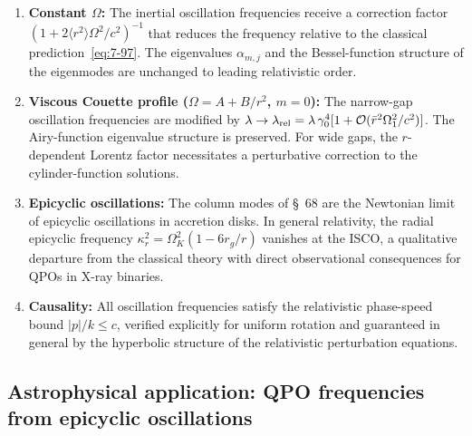 \begin{enumerate}
\item \textbf{Constant $\Omega$:} The inertial oscillation frequencies
  receive a correction factor $(1+2\langle r^2\rangle\Omega^2/c^2)^{-1}$
  that reduces the frequency relative to the classical
  prediction~\eqref{eq:7-97}.  The eigenvalues $\alpha_{m,j}$ and
  the Bessel-function structure of the eigenmodes are unchanged to
  leading relativistic order.

\item \textbf{Viscous Couette profile ($\Omega = A+B/r^2$, $m=0$):}
  The narrow-gap oscillation frequencies are modified by
  $\lambda \to \lambda_{\mathrm{rel}} = \lambda\,\gamma_0^4[1+\mathcal{O}(\bar{r}^2\Omega_1^2/c^2)]$.
  The Airy-function eigenvalue structure is preserved.  For wide gaps,
  the $r$-dependent Lorentz factor necessitates a perturbative correction
  to the cylinder-function solutions.

\item \textbf{Epicyclic oscillations:} The column modes of \S~68
  are the Newtonian limit of epicyclic oscillations in accretion disks.
  In general relativity, the radial epicyclic frequency
  $\kappa_r^2 = \Omega_K^2(1-6r_g/r)$ vanishes at the ISCO,
  a qualitative departure from the classical theory with direct
  observational consequences for QPOs in X-ray binaries.

\item \textbf{Causality:} All oscillation frequencies satisfy the
  relativistic phase-speed bound $|p|/k \le c$, verified explicitly
  for uniform rotation and guaranteed in general by the hyperbolic
  structure of the relativistic perturbation equations.
\end{enumerate}

\subsection{Astrophysical application: QPO frequencies from
  epicyclic oscillations}
\label{sec:rel-7-68-qpo-application}

